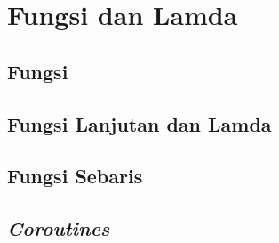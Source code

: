 \chapter{Fungsi dan Lamda}

\section{Fungsi}

\section{Fungsi Lanjutan dan Lamda}

\section{Fungsi Sebaris}

\section{\textit{Coroutines}}